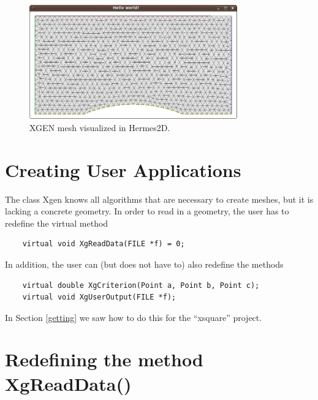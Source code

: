 \documentclass[12pt]{article}
\begin{document}
  \begin{figure}[!ht]
  \begin{center}
  \includegraphics[width=0.8\textwidth]{xgen-6.png}
  \end{center}
  \vspace{-6mm}
  \caption{XGEN mesh visualized in Hermes2D.}
  \label{fig:hermes}
  \end{figure}


  \section{Creating User Applications} \label{vl_apl}

  The class Xgen knows all algorithms that are
  necessary to create meshes, but it is lacking a concrete geometry. 
  In order to read in a geometry, the user has to redefine the virtual 
  method

  \begin{verbatim}
    virtual void XgReadData(FILE *f) = 0;
  \end{verbatim}

  \noindent
  In addition, the user can (but does not have to) also redefine the methods
  \begin{verbatim}
    virtual double XgCriterion(Point a, Point b, Point c);
    virtual void XgUserOutput(FILE *f);
  \end{verbatim}
  In Section \ref{getting} we saw how to do this for the ``xsquare'' project.

  \section{Redefining the method XgReadData()}
\end{document}

